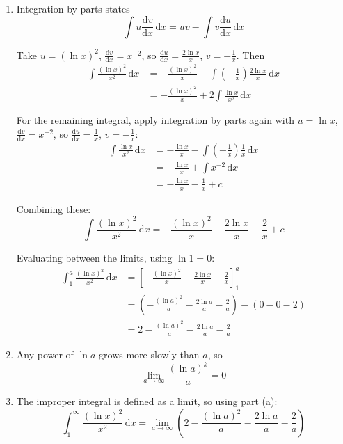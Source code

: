 \documentclass[leqno]{article}
\begin{document}
\begin{enumerate}[
  label=\textbf{\arabic*.},
  leftmargin=*,
  topsep=0pt,
  partopsep=0pt,
  parsep=0pt
]
\vspace*{10pt}

\begin{djsSolution}
\begin{enumerate}[label=\textbf{(\alph*)}, start=1]
  \item Integration by parts states
\[
\int u\frac{\mathrm{d}v}{\mathrm{d}x}\,\mathrm{d}x = uv - \int v\frac{\mathrm{d}u}{\mathrm{d}x}\,\mathrm{d}x
\]

Take \(u=(\ln x)^2\), \(\frac{\mathrm{d}v}{\mathrm{d}x}=x^{-2}\), so \(\frac{\mathrm{d}u}{\mathrm{d}x}=\frac{2\ln x}{x}\), \(v=-\frac{1}{x}\). Then
\begin{align*}
\int \frac{(\ln x)^2}{x^2}\,\mathrm{d}x &= -\frac{(\ln x)^2}{x} - \int \left(-\frac{1}{x}\right)\frac{2\ln x}{x}\,\mathrm{d}x\\
&= -\frac{(\ln x)^2}{x} + 2\int \frac{\ln x}{x^2}\,\mathrm{d}x
\end{align*}

For the remaining integral, apply integration by parts again with \(u=\ln x\), \(\frac{\mathrm{d}v}{\mathrm{d}x}=x^{-2}\), so \(\frac{\mathrm{d}u}{\mathrm{d}x}=\frac{1}{x}\), \(v=-\frac{1}{x}\):
\begin{align*}
\int \frac{\ln x}{x^2}\,\mathrm{d}x &= -\frac{\ln x}{x} - \int \left(-\frac{1}{x}\right)\frac{1}{x}\,\mathrm{d}x\\
&= -\frac{\ln x}{x} + \int x^{-2}\,\mathrm{d}x\\
&= -\frac{\ln x}{x} - \frac{1}{x} + c
\end{align*}

Combining these:
\[
\int \frac{(\ln x)^2}{x^2}\,\mathrm{d}x = -\frac{(\ln x)^2}{x} - \frac{2\ln x}{x} - \frac{2}{x} + c
\]

Evaluating between the limits, using \(\ln 1=0\):
\begin{align*}
\int_1^a \frac{(\ln x)^2}{x^2}\,\mathrm{d}x &= \left[-\frac{(\ln x)^2}{x} - \frac{2\ln x}{x} - \frac{2}{x}\right]_1^a\\
&= \left(-\frac{(\ln a)^2}{a} - \frac{2\ln a}{a} - \frac{2}{a}\right) - (0 - 0 - 2)\\
&= 2 - \frac{(\ln a)^2}{a} - \frac{2\ln a}{a} - \frac{2}{a}
\end{align*}

  \item Any power of \(\ln a\) grows more slowly than \(a\), so
\[
\lim_{a \to \infty} \frac{(\ln a)^k}{a} = 0
\]

  \item The improper integral is defined as a limit, so using part (a):
\[
\int_1^{\infty} \frac{(\ln x)^2}{x^2}\,\mathrm{d}x = \lim_{a\to\infty}\left(2 - \frac{(\ln a)^2}{a} - \frac{2\ln a}{a} - \frac{2}{a}\right)
\]


\end{enumerate}
\end{djsSolution}
\end{enumerate}
\end{document}
